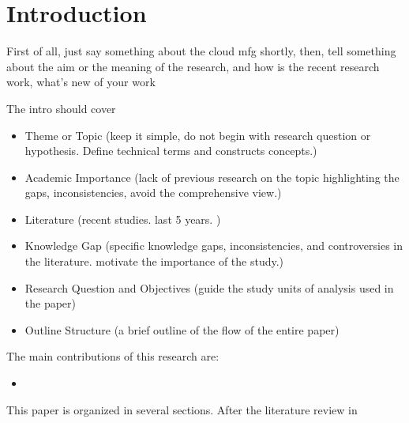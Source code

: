 \section{Introduction}
First of all, just say something about the cloud mfg shortly,
then, tell something about the aim or the meaning of the research,
and how is the recent research work, what's new of your work 


The intro should cover 
\begin{itemize}
	\item Theme or Topic (keep it simple, do not begin with research question or hypothesis. Define technical terms and constructs concepts.)
	\item Academic Importance (lack of previous research on the topic highlighting the gaps, inconsistencies, avoid the comprehensive view.)
	\item Literature (recent studies. last 5 years. )
	\item Knowledge Gap (specific knowledge gaps, inconsistencies, and controversies in the literature. motivate the importance of the study.)
	\item Research Question and Objectives (guide the study units of analysis used in the paper)
	\item Outline Structure (a brief outline of the flow of the entire paper)
\end{itemize}


The main contributions of this research are:
\begin{itemize}
	\item 
\end{itemize}


This paper is organized in several sections. 
After the literature review in 
